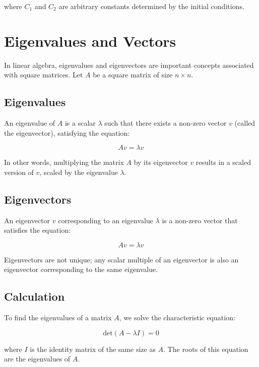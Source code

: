 \documentclass[a4paper,12pt]{article}
\begin{document}
where $C_1$ and $C_2$ are arbitrary constants determined by the initial conditions.


\section{Eigenvalues and Vectors}

In linear algebra, eigenvalues and eigenvectors are important concepts associated with square matrices. Let \(A\) be a square matrix of size \(n \times n\).

\subsection*{Eigenvalues}

An eigenvalue of \(A\) is a scalar \(\lambda\) such that there exists a non-zero vector \(v\) (called the eigenvector), satisfying the equation:

\[
Av = \lambda v
\]

In other words, multiplying the matrix \(A\) by its eigenvector \(v\) results in a scaled version of \(v\), scaled by the eigenvalue \(\lambda\).

\subsection*{Eigenvectors}

An eigenvector \(v\) corresponding to an eigenvalue \(\lambda\) is a non-zero vector that satisfies the equation:

\[
Av = \lambda v
\]

Eigenvectors are not unique; any scalar multiple of an eigenvector is also an eigenvector corresponding to the same eigenvalue.

\subsection*{Calculation}

To find the eigenvalues of a matrix \(A\), we solve the characteristic equation:

\[
\text{det}(A - \lambda I) = 0
\]

where \(I\) is the identity matrix of the same size as \(A\). The roots of this equation are the eigenvalues of \(A\).
\end{document}
